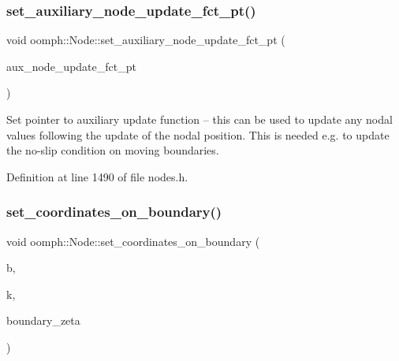 \subsubsection{\texorpdfstring{set\+\_\+auxiliary\+\_\+node\+\_\+update\+\_\+fct\+\_\+pt()}{set\_auxiliary\_node\_update\_fct\_pt()}}
{\footnotesize\ttfamily void oomph\+::\+Node\+::set\+\_\+auxiliary\+\_\+node\+\_\+update\+\_\+fct\+\_\+pt (\begin{DoxyParamCaption}\item[{\hyperlink{classoomph_1_1Node_afcc4cc3e1e48964baf23fa44c98293a9}{Aux\+Node\+Update\+Fct\+Pt}}]{aux\+\_\+node\+\_\+update\+\_\+fct\+\_\+pt }\end{DoxyParamCaption})\hspace{0.3cm}{\ttfamily [inline]}}



Set pointer to auxiliary update function -- this can be used to update any nodal values following the update of the nodal position. This is needed e.\+g. to update the no-\/slip condition on moving boundaries. 



Definition at line 1490 of file nodes.\+h.

\mbox{\label{classoomph_1_1Node_a94c19e165ab4e88aabbfa27443c530b7}} 
\subsubsection{\texorpdfstring{set\+\_\+coordinates\+\_\+on\+\_\+boundary()}{set\_coordinates\_on\_boundary()}\hspace{0.1cm}{\footnotesize\ttfamily [1/2]}}
{\footnotesize\ttfamily void oomph\+::\+Node\+::set\+\_\+coordinates\+\_\+on\+\_\+boundary (\begin{DoxyParamCaption}\item[{const unsigned \&}]{b,  }\item[{const unsigned \&}]{k,  }\item[{const \hyperlink{classoomph_1_1Vector}{Vector}$<$ double $>$ \&}]{boundary\+\_\+zeta }\end{DoxyParamCaption})\hspace{0.3cm}{\ttfamily [virtual]}}



